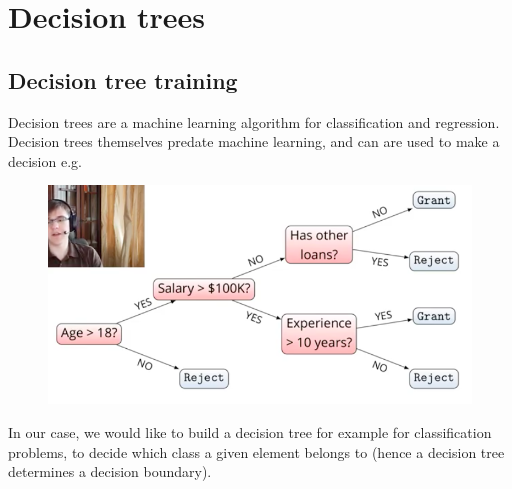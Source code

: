 \newpage
\section{Decision trees}

\subsection{Decision tree training}
Decision trees are a machine learning algorithm for classification and regression. Decision trees themselves predate machine learning, and can are used to make a decision e.g.
\begin{figure}[H]
\centering
\includegraphics[scale=0.4]{decisiontree.png}
\end{figure}
In our case, we would like to build a decision tree for example for classification problems, to decide which class a given element belongs to (hence a decision tree determines a decision boundary).\\

